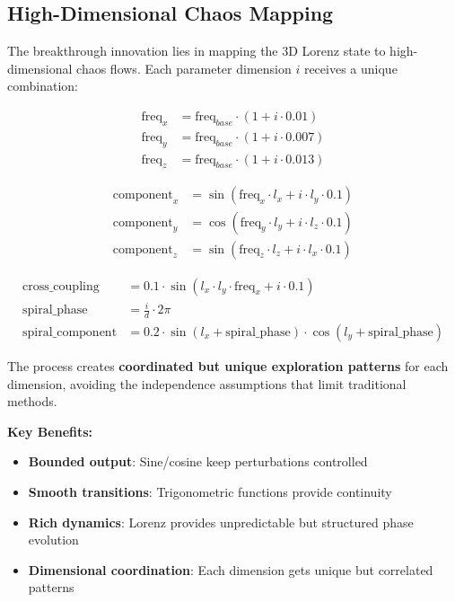 \documentclass[11pt,a4paper]{article}
\begin{document}
\subsection{High-Dimensional Chaos Mapping}

The breakthrough innovation lies in mapping the 3D Lorenz state to high-dimensional chaos flows. Each parameter dimension $i$ receives a unique combination:

\begin{align}
\text{freq}_x &= \text{freq}_{base} \cdot (1 + i \cdot 0.01) \\
\text{freq}_y &= \text{freq}_{base} \cdot (1 + i \cdot 0.007) \\
\text{freq}_z &= \text{freq}_{base} \cdot (1 + i \cdot 0.013)
\end{align}

\begin{align}
\text{component}_x &= \sin(\text{freq}_x \cdot l_x + i \cdot l_y \cdot 0.1) \\
\text{component}_y &= \cos(\text{freq}_y \cdot l_y + i \cdot l_z \cdot 0.1) \\
\text{component}_z &= \sin(\text{freq}_z \cdot l_z + i \cdot l_x \cdot 0.1)
\end{align}

\begin{align}
\text{cross\_coupling} &= 0.1 \cdot \sin(l_x \cdot l_y \cdot \text{freq}_x + i \cdot 0.1) \\
\text{spiral\_phase} &= \frac{i}{d} \cdot 2\pi \\
\text{spiral\_component} &= 0.2 \cdot \sin(l_x + \text{spiral\_phase}) \cdot \cos(l_y + \text{spiral\_phase})
\end{align}

The process creates \textbf{coordinated but unique exploration patterns} for each dimension, avoiding the independence assumptions that limit traditional methods.

\textbf{Key Benefits:}
\begin{itemize}
\item \textbf{Bounded output}: Sine/cosine keep perturbations controlled
\item \textbf{Smooth transitions}: Trigonometric functions provide continuity
\item \textbf{Rich dynamics}: Lorenz provides unpredictable but structured phase evolution
\item \textbf{Dimensional coordination}: Each dimension gets unique but correlated patterns
\end{itemize}
\end{document}
